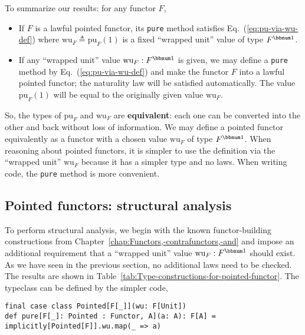 To summarize our results: for any functor $F$,
\begin{itemize}
\item If $F$ is a lawful pointed functor, its \lstinline!pure! method
satisfies Eq.~(\ref{eq:pu-via-wu-def}) where $\text{wu}_{F}\triangleq\text{pu}_{F}(1)$
is a fixed \textsf{``}wrapped unit\textsf{''} value of type $F^{\bbnum 1}$.
\item If any \textsf{``}wrapped unit\textsf{''} value $\text{wu}_{F}:F^{\bbnum 1}$ is given,
we may define a \lstinline!pure! method by Eq.~(\ref{eq:pu-via-wu-def})
and make the functor $F$ into a lawful pointed functor; the naturality
law will be satisfied automatically. The value $\text{pu}_{F}(1)$
will be equal to the originally given value $\text{wu}_{F}$.
\end{itemize}
So, the types of $\text{pu}_{F}$ and $\text{wu}_{F}$ are\textbf{
equivalent}: each one can be converted into
the other and back without loss of information. We may define a pointed
functor equivalently as a functor with a chosen value $\text{wu}_{F}$
of type $F^{\bbnum 1}$. When reasoning about pointed functors, it
is simpler to use the definition via the \textsf{``}wrapped unit\textsf{''} $\text{wu}_{F}$
because it has a simpler type and no laws. When writing code, the
\lstinline!pure! method is more convenient.

\subsection{Pointed functors: structural analysis\label{subsec:Pointed-functors:-structural-analysis}}

To perform structural analysis, we begin with the known functor-building
constructions from Chapter~\ref{chap:Functors,-contrafunctors,-and}
and impose an additional requirement that a \textsf{``}wrapped unit\textsf{''} value
$\text{wu}_{F}:F^{\bbnum 1}$ should exist. As we have seen in the
previous section, no additional laws need to be checked. The results
are shown in Table~\ref{tab:Type-constructions-for-pointed-functor}.
The typeclass can be defined by the simpler code,
\begin{lstlisting}
final case class Pointed[F[_]](wu: F[Unit])
def pure[F[_]: Pointed : Functor, A](a: A): F[A] = implicitly[Pointed[F]].wu.map(_ => a)
\end{lstlisting}


